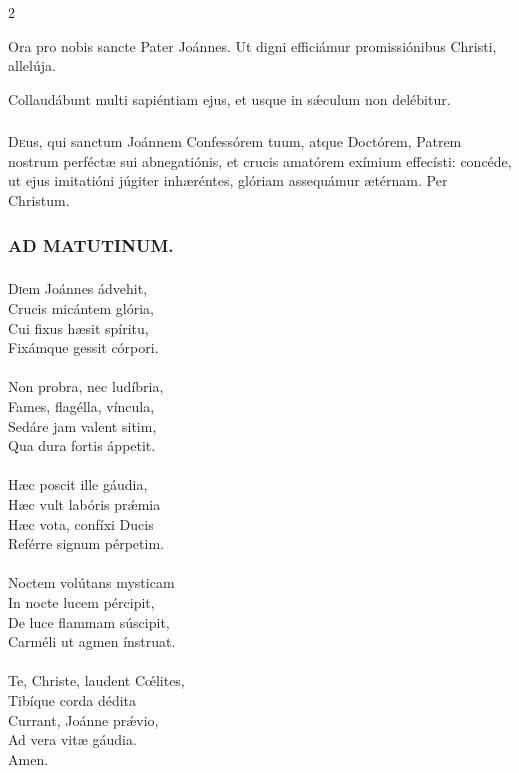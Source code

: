 \documentclass[9pt,twoside]{extarticle}
\begin{document}
\begin{multicols}{2}
\begin{tightlist}{}
\item {} Ora pro nobis sancte Pater Joánnes.  Ut digni efficiámur promissiónibus Christi, allelúja. 
\item {} Collaudábunt multi sapiéntiam ejus, et usque in sǽculum non delébitur.
\end{tightlist}

\subsubsection*{\center {}}
\lettrine{D}eus, qui sanctum Joánnem Confessórem tuum, atque Doctórem, Patrem nostrum perféctæ sui abnegatiónis, et crucis amatórem exímium effecísti: concéde, ut ejus imitatióni júgiter inhæréntes, glóriam assequámur ætérnam. Per Christum.

\subsubsection*{\center \textsc{AD MATUTINUM.}}
\subsubsection*{\center{}}
\lettrine{D}iem Joánnes ádvehit,\\ Crucis micántem glória,\\ Cui fixus hæsit spíritu,\\ Fixámque gessit córpori.\\
\\
Non probra, nec ludíbria,\\ Fames, flagélla, víncula,\\ Sedáre jam valent sitim,\\ Qua dura fortis áppetit.\\
\\
Hæc poscit ille gáudia,\\ Hæc vult labóris prǽmia\\ Hæc vota, confíxi Ducis\\ Reférre signum pérpetim.\\
\\
Noctem volútans mysticam\\ In nocte lucem pércipit,\\ De luce flammam súscipit,\\ Carméli ut agmen ínstruat.\\
\\
Te, Christe, laudent Cœ́lites,\\ Tibíque corda dédita\\ Currant, Joánne prǽvio,\\ Ad vera vitæ gáudia.\\
Amen.


\end{multicols}
\end{document}
